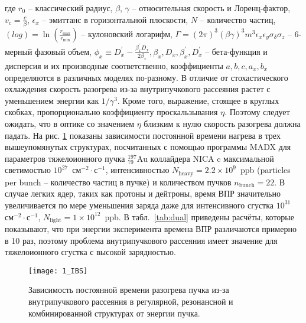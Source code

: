 \begin{comment}
\begin{equation}
\frac{1}{\tau_{\textrm{IBS}}}=\frac{\sqrt\pi}{4}\frac{cZ^2r_p^2L_C}{A}\cdot\frac{N}{C_{\mathrm{orb\ }}}\cdot\frac{\left\langle\beta_x\right\rangle}{\beta^3\gamma^3\varepsilon_x^{5/2}\left\langle\sqrt{\beta_x}\right\rangle}\left(\left\langle\frac{D_x^2+{\dot{D}}_x^2}{\beta_x^2}\right\rangle-\frac{1}{\gamma^2}\right).
\label{eq:IBS}
\end{equation}
\end{comment}

\noindent где $r_0$ -- классический радиус, $\beta$, $\gamma$ -- относительная скорость и Лоренц-фактор, $v_c=\frac{c}{\beta}$,  $\epsilon_x$ -- эмиттанс в горизонтальной плоскости, $N$ -- количество частиц, $\left(log\right)=\ln{\left(\frac{r_{\text{max}}}{r_{\text{min}}}\right)}$ -- кулоновский логарифм, $\Gamma=(2\pi)^3(\beta\gamma)^3m^3\epsilon_x\epsilon_y\sigma_\delta\sigma_z$ -- 6-мерный фазовый объем, $\phi_x\equiv D_x^\prime-\frac{\beta_x^\prime{D}_x}{2\beta_x}, \beta_x,D_x,\beta_x^\prime,D_x^\prime$ -- бета-функция и дисперсия и их производные соответственно,  коэффициенты $a, b, c, a_x,b_x$ определяются в различных моделях по-разному. В отличие от стохастического охлаждения скорость разогрева из-за внутрипучкового рассеяния растет с уменьшением энергии как $1/\gamma^3$. Кроме того, выражение, стоящее в круглых скобках, пропорционально коэффициенту проскальзывания $\eta$. Поэтому следует ожидать, что в оптике со значением $\eta$ близким к нулю скорость разогрева должна падать. На рис. \ref{fig:1_IBS} показаны зависимости постоянной времени нагрева в трех вышеупомянутых структурах, посчитанных с помощью программы MADX \cite{madx, antoniou:ibs} для параметров тяжелоионного пучка ${_{79}^{197}}\textrm{Au}$ коллайдера NICA c максимальной светимостью ${10}^{27}$~$\text{см}^{-2}\cdot\text{с}^{-1}$, интенсивностью $N_{\text{heavy}} = 2.2\times10^9$~ppb (particles per bunch -- количество частиц в пучке) и количеством пучков $n_{\text{bunch}}=22$. В случае легких ядер, таких как протоны и дейтроны, время ВПР значительно увеличивается по мере уменьшения заряда даже для интенсивного сгустка ${10}^{31}$~$\text{см}^{-2}\cdot\text{с}^{-1}$, $N_{\text{light}} = 1\times10^{12}$~ppb. В табл.~\ref{tab:dual} приведены расчёты, которые показывают, что при энергии эксперимента времена ВПР различаются примерно в 10 раз, поэтому проблема внутрипучкового рассеяния имеет значение для тяжелоионного сгустка с высокой зарядностью.

\begin{figure}[!h]
  \centering
   \texttt{[image: 1\_IBS]}
   \caption{Зависимость постоянной времени разогрева пучка из-за внутрипучкового рассеяния в регулярной, резонансной и комбинированной структурах от энергии пучка.}
   \label{fig:1_IBS}
\end{figure}

